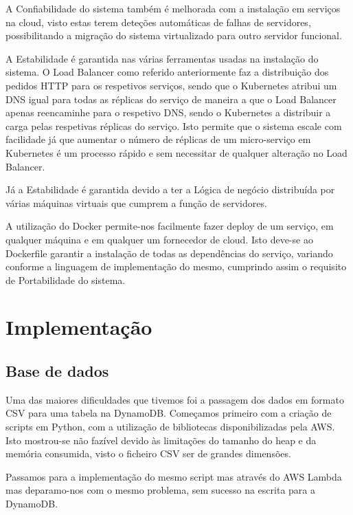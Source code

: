 \documentclass[11pt,a4paper]{article}
\begin{document}
A Confiabilidade do sistema também é melhorada com a instalação em serviços na cloud, visto estas terem deteções automáticas de falhas de servidores, possibilitando a migração do sistema virtualizado para outro servidor funcional.
\newline

A Estabilidade é garantida nas várias ferramentas usadas na instalação do sistema. O Load Balancer como referido anteriormente faz a distribuição dos pedidos HTTP para os respetivos serviços, sendo que o Kubernetes atribui um DNS igual para todas as réplicas do serviço de maneira a que o Load Balancer apenas reencaminhe para o respetivo DNS, sendo o Kubernetes a distribuir a carga pelas respetivas réplicas do serviço. Isto permite que o sistema escale com facilidade já que aumentar o número de réplicas de um micro-serviço em Kubernetes é um processo rápido e sem necessitar de qualquer alteração no Load Balancer.
\newline

Já a Estabilidade é garantida devido a ter a Lógica de negócio distribuída por várias máquinas virtuais que cumprem a função de servidores.
\newline


A utilização do Docker permite-nos facilmente fazer deploy de um serviço, em qualquer máquina e em qualquer um fornecedor de cloud. Isto deve-se ao Dockerfile garantir a instalação de todas as dependências do serviço, variando conforme a linguagem de implementação do mesmo, cumprindo assim o requisito de Portabilidade do sistema.

\section{Implementação}

\subsection{Base de dados}
Uma das maiores dificuldades que tivemos foi a passagem dos dados em formato CSV para uma tabela na DynamoDB. Começamos primeiro com a criação de scripts em Python, com a utilização de bibliotecas disponibilizadas pela AWS. Isto mostrou-se não fazível devido às limitações do tamanho do heap e da memória consumida, visto o ficheiro CSV ser de grandes dimensões.

Passamos para a implementação do mesmo script mas através do AWS Lambda mas deparamo-nos com o mesmo problema, sem sucesso na escrita para a DynamoDB.
\end{document}
